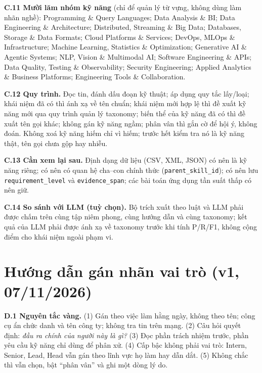 \documentclass[12pt]{article}
\newcommand{\code}[1]{\texttt{#1}}
\begin{document}
\textbf{C.11 Mười lăm nhóm kỹ năng} (chỉ để quản lý từ vựng, không dùng làm nhãn nghề): Programming \& Query Languages; Data Analysis \& BI; Data Engineering \& Architecture; Distributed, Streaming \& Big Data; Databases, Storage \& Data Formats; Cloud Platforms \& Services; DevOps, MLOps \& Infrastructure; Machine Learning, Statistics \& Optimization; Generative AI \& Agentic Systems; NLP, Vision \& Multimodal AI; Software Engineering \& APIs; Data Quality, Testing \& Observability; Security Engineering; Applied Analytics \& Business Platforms; Engineering Tools \& Collaboration.

\textbf{C.12 Quy trình.} Đọc tin, đánh dấu đoạn kỹ thuật; áp dụng quy tắc lấy/loại; khái niệm đã có thì ánh xạ về tên chuẩn; khái niệm mới hợp lệ thì đề xuất kỹ năng mới qua quy trình quản lý taxonomy; biến thể của kỹ năng đã có thì đề xuất tên gọi khác; không gán kỹ năng ngầm; phân vân thì gắn cờ để hội ý, không đoán. Không xoá kỹ năng hiếm chỉ vì hiếm; trước hết kiểm tra nó là kỹ năng thật, tên gọi chưa gộp hay nhiễu.

\textbf{C.13 Cần xem lại sau.} Định dạng dữ liệu (CSV, XML, JSON) có nên là kỹ năng riêng; có nên có quan hệ cha--con chính thức (\code{parent\_skill\_id}); có nên lưu \code{requirement\_level} và \code{evidence\_span}; các bài toán ứng dụng tần suất thấp có nên giữ.

\textbf{C.14 So sánh với LLM (tuỳ chọn).} Bộ trích xuất theo luật và LLM phải được chấm trên cùng tập niêm phong, cùng hướng dẫn và cùng taxonomy; kết quả của LLM phải được ánh xạ về taxonomy trước khi tính P/R/F1, không cộng điểm cho khái niệm ngoài phạm vi.

\section{Hướng dẫn gán nhãn vai trò (v1, 07/11/2026)}
\label{app:role-guideline}
\textbf{D.1 Nguyên tắc vàng.} (1) Gán theo việc làm hằng ngày, không theo tên; công cụ ẩn chức danh và tên công ty; không tra tin trên mạng. (2) Câu hỏi quyết định: \textit{đầu ra chính của người này là gì?} (3) Đọc phần trách nhiệm trước, phần yêu cầu kỹ năng chỉ dùng để phân xử. (4) Cấp bậc không phải vai trò: Intern, Senior, Lead, Head vẫn gán theo lĩnh vực họ làm hay dẫn dắt. (5) Không chắc thì vẫn chọn, bật ``phân vân'' và ghi một dòng lý do.
\end{document}
